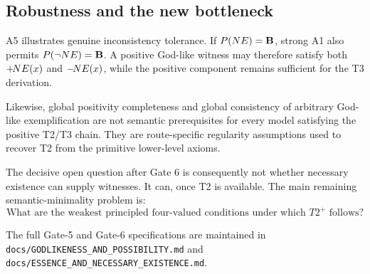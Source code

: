 \subsection{Robustness and the new bottleneck}

A5 illustrates genuine inconsistency tolerance. If \(P(NE)=\mathbf{B}\), strong A1 also permits \(P(\neg NE)=\mathbf{B}\). A positive God-like witness may therefore satisfy both \(+\!NE(x)\) and \(-\!NE(x)\), while the positive component remains sufficient for the T3 derivation.

Likewise, global positivity completeness and global consistency of arbitrary God-like exemplification are not semantic prerequisites for every model satisfying the positive T2/T3 chain. They are route-specific regularity assumptions used to recover T2 from the primitive lower-level axioms.

The decisive open question after Gate 6 is consequently not whether necessary existence can supply witnesses. It can, once T2 is available. The main remaining semantic-minimality problem is:
\[
  \boxed{
  \text{What are the weakest principled four-valued conditions under which }T2^+\text{ follows?}
  }
\]

The full Gate-5 and Gate-6 specifications are maintained in \texttt{docs/GODLIKENESS\_AND\_POSSIBILITY.md} and \texttt{docs/ESSENCE\_AND\_NECESSARY\_EXISTENCE.md}.
